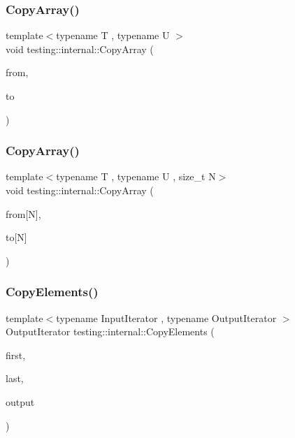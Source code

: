 \subsubsection{\texorpdfstring{Copy\+Array()}{CopyArray()}\hspace{0.1cm}{\footnotesize\ttfamily [2/3]}}
{\footnotesize\ttfamily template$<$typename T , typename U $>$ \\
void testing\+::internal\+::\+Copy\+Array (\begin{DoxyParamCaption}\item[{const T \&}]{from,  }\item[{U $\ast$}]{to }\end{DoxyParamCaption})\hspace{0.3cm}{\ttfamily [inline]}}

\mbox{\label{namespacetesting_1_1internal_a1e7ae855686720615dcd5754c8181c62}} 
\subsubsection{\texorpdfstring{Copy\+Array()}{CopyArray()}\hspace{0.1cm}{\footnotesize\ttfamily [3/3]}}
{\footnotesize\ttfamily template$<$typename T , typename U , size\+\_\+t N$>$ \\
void testing\+::internal\+::\+Copy\+Array (\begin{DoxyParamCaption}\item[{const T(\&)}]{from\mbox{[}\+N\mbox{]},  }\item[{U($\ast$)}]{to\mbox{[}\+N\mbox{]} }\end{DoxyParamCaption})\hspace{0.3cm}{\ttfamily [inline]}}

\mbox{\label{namespacetesting_1_1internal_a9372c12747bcf964aacb1284f8048cae}} 
\subsubsection{\texorpdfstring{Copy\+Elements()}{CopyElements()}}
{\footnotesize\ttfamily template$<$typename Input\+Iterator , typename Output\+Iterator $>$ \\
Output\+Iterator testing\+::internal\+::\+Copy\+Elements (\begin{DoxyParamCaption}\item[{Input\+Iterator}]{first,  }\item[{Input\+Iterator}]{last,  }\item[{Output\+Iterator}]{output }\end{DoxyParamCaption})\hspace{0.3cm}{\ttfamily [inline]}}


